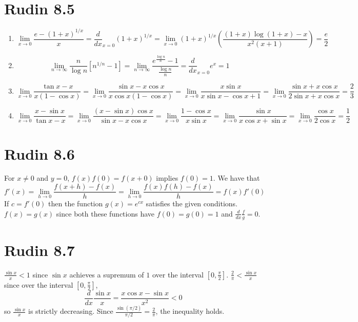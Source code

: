 \documentclass{article}
\begin{document}
\section*{Rudin 8.5}
\begin{enumerate}[label=(\alph*)]
  \item \[
    \lim_{x\to 0} \frac{e-(1+x)^{1/x}}{x} 
    = \frac{d}{dx}_{x=0} (1+x)^{1/x}
    = \lim_{x\to 0} (1+x)^{1/x}\left(\frac{(1+x)\log(1+x) - x}{x^2(x+1)}\right)
    = \frac{e}{2}
  \]
  \item \[
  \lim_{n\to \infty} \frac{n}{\log n}[n^{1/n}-1]
  = \lim_{n\to \infty} \frac{e^{\frac{\log n}{n}}-1}{\frac{\log n}{n}}
  = \frac{d}{dx}_{x=0} e^x
  = 1
  \]
  \item \[
    \lim_{x\to 0} \frac{\tan x - x}{x(1-\cos x)} =
    \lim_{x\to 0} \frac{\sin x - x\cos x}{x\cos x (1-\cos x)} = 
    \lim_{x\to 0} \frac{x\sin x}{x\sin x -\cos x + 1} = 
    \lim_{x\to 0} \frac{\sin x + x\cos x}{2\sin x + x\cos x} = 
    \frac{2}{3}
  \]
  \item \[
    \lim_{x\to 0} \frac{x-\sin x}{\tan x - x} =
    \lim_{x\to 0} \frac{(x-\sin x)\cos x}{\sin x - x\cos x} = 
    \lim_{x\to 0} \frac{1-\cos x}{x\sin x} = 
    \lim_{x\to 0} \frac{\sin x}{x\cos x + \sin x} =
    \lim_{x\to 0} \frac{\cos x}{2\cos x} =
    \frac{1}{2}
  \]
\end{enumerate}
\newpage

\section{Rudin 8.6}
For $x\neq 0$ and $y=0$,  $f(x)f(0) = f(x+0)$ implies $f(0) = 1$.
We have that 
\[
  f'(x) = \lim_{h\to 0} \frac{f(x+h) - f(x)}{h}
  = \lim_{h\to 0} \frac{f(x)f(h) - f(x)}{h}
  = f(x) f'(0)
\]
If $c= f'(0)$ then the function $g(x) = e^{cx}$
satisfies the given conditions.
$f(x) = g(x)$ since both these functions have $f(0) = g(0) = 1$
and $\frac{d}{dx} \frac{f}{g} = 0$.
\newpage 

\section*{Rudin 8.7}
$\frac{\sin x}{x} < 1$ since $\sin x$ achieves a supremum of $1$ over the interval $[0, \frac{\pi}{2}]$.
$\frac{2}{\pi} < \frac{\sin x}{x}$ since over the interval $[0, \frac{\pi}{2}]$,
\[
  \frac{d}{dx} \frac{\sin x}{x}  = \frac{x\cos x -\sin x}{x^2} < 0
\]
so $\frac{\sin x}{x}$ is strictly decreasing.
Since $\frac{\sin(\pi/2)}{\pi/2} = \frac{2}{\pi}$, the inequality holds.
\newpage 
\end{document}

